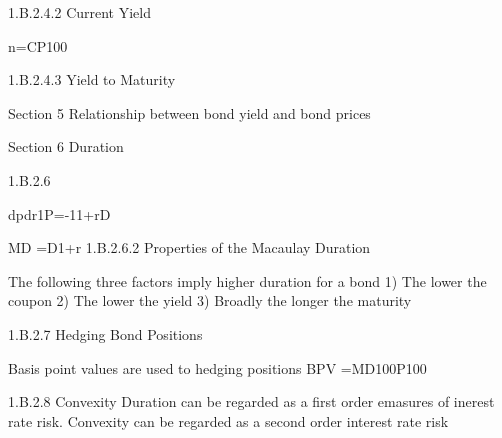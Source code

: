 1.B.2.4.2 Current Yield

n=CP100%


1.B.2.4.3 Yield to Maturity


Section 5 Relationship between bond yield and bond prices

Section 6 Duration





1.B.2.6

dpdr1P=-11+rD

MD =D1+r
1.B.2.6.2 Properties of the Macaulay Duration

The following three factors imply higher duration for a  bond
1) The lower the coupon
2) The lower the yield
3) Broadly the longer the maturity

1.B.2.7 Hedging Bond Positions

Basis point values are used to hedging positions
BPV =MD100P100

1.B.2.8 Convexity
Duration can be regarded as a first order emasures of inerest rate risk.
Convexity can be regarded as a second order interest rate risk

